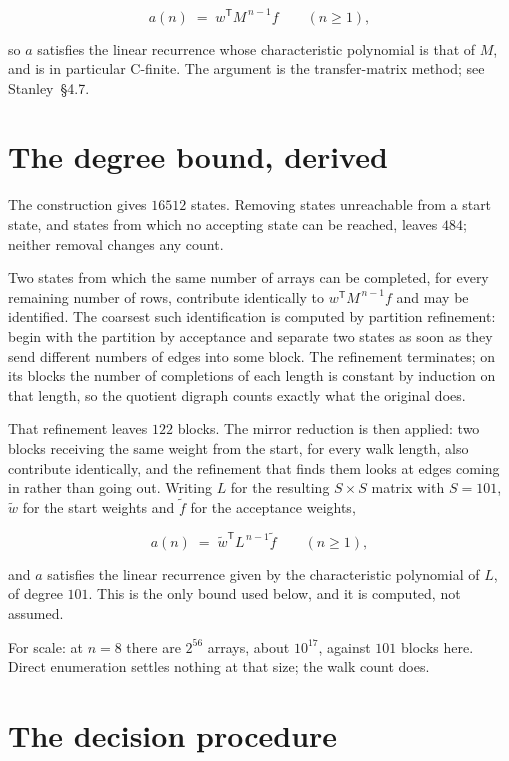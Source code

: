 \documentclass[11pt]{article}
\theoremstyle{definition}
\begin{document}
\[a(n) \;=\; w^{\mathsf T} M^{\,n-1} f \qquad (n \ge 1),\]

so $a$ satisfies the linear recurrence whose characteristic polynomial is that of $M$, and is in particular C-finite. The argument is the transfer-matrix method; see Stanley~\S4.7.

\section{The degree bound, derived}

The construction gives $16512$ states. Removing states unreachable from a start state, and states from which no accepting state can be reached, leaves $484$; neither removal changes any count.

Two states from which the same number of arrays can be completed, for every remaining number of rows, contribute identically to $w^{\mathsf T}M^{\,n-1}f$ and may be identified. The coarsest such identification is computed by partition refinement: begin with the partition by acceptance and separate two states as soon as they send different numbers of edges into some block. The refinement terminates; on its blocks the number of completions of each length is constant by induction on that length, so the quotient digraph counts exactly what the original does.

That refinement leaves $122$ blocks. The mirror reduction is then applied: two blocks receiving the same weight from the start, for every walk length, also contribute identically, and the refinement that finds them looks at edges coming in rather than going out. Writing $L$ for the resulting $S \times S$ matrix with $S = 101$, $\tilde w$ for the start weights and $\tilde f$ for the acceptance weights,

\[a(n) \;=\; \tilde w^{\mathsf T} L^{\,n-1} \tilde f \qquad (n \ge 1),\]

and $a$ satisfies the linear recurrence given by the characteristic polynomial of $L$, of degree $101$. This is the only bound used below, and it is computed, not assumed.

For scale: at $n = 8$ there are $2^{56}$ arrays, about $10^{17}$, against $101$ blocks here. Direct enumeration settles nothing at that size; the walk count does.

\section{The decision procedure}
\end{document}
